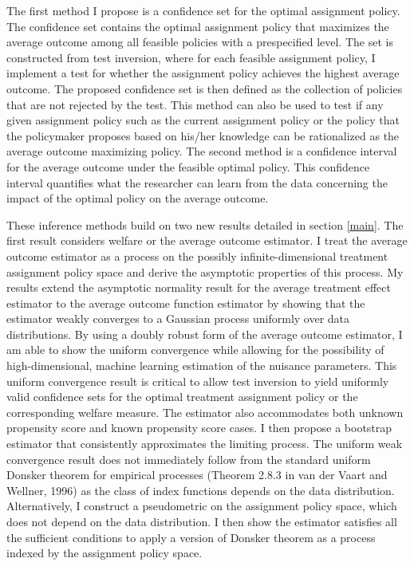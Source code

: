\documentclass[12pt,oneside,reqno,english]{amsart}
\theoremstyle{definition}
\begin{document}
The first method I propose is a confidence set for the optimal assignment policy. 
The confidence set contains the optimal assignment policy that maximizes the average outcome among all feasible policies with a prespecified level.
The set is constructed from test inversion, where for each feasible assignment policy, I implement a test for whether the assignment policy 
achieves the highest average outcome. The proposed confidence set is then defined as the collection of policies that are not rejected by the test. 
This method can also be used to test if any given assignment policy such as the current assignment policy or the policy that the policymaker proposes based on his/her knowledge can be rationalized as the average outcome maximizing policy. The second method is a confidence interval for the average outcome under the feasible optimal policy. This confidence interval quantifies what the researcher can learn from the data concerning the impact of the optimal policy on the average outcome. 


These inference methods build on two new results detailed in section \ref{main}. 
The first result considers welfare or the average outcome estimator. I treat the average outcome estimator as a process on the possibly infinite-dimensional treatment assignment policy space and derive the asymptotic
properties of this process. My results extend the asymptotic normality result for the average treatment effect estimator to the average outcome function estimator by showing that the estimator weakly converges to a Gaussian process uniformly over data distributions. 
By using a doubly robust form of the average outcome estimator, I am able to show the uniform convergence while allowing for the possibility of high-dimensional, machine learning estimation of the nuisance parameters. 
This uniform convergence result is critical to allow test inversion to yield uniformly valid confidence sets for the optimal treatment assignment policy or the corresponding welfare measure. The estimator also accommodates both unknown propensity score and known propensity score cases. I then propose a bootstrap estimator that consistently approximates the limiting process. 
The uniform weak convergence result does not immediately follow from the standard uniform Donsker theorem for empirical processes (Theorem 2.8.3 in van der Vaart and Wellner, 1996) as the class of index functions depends on the data distribution. Alternatively, I construct a pseudometric on the assignment policy space, which does not depend on the data distribution. I then show the estimator satisfies all the sufficient conditions to apply a version of Donsker theorem as a process indexed by the assignment policy space.  
\end{document}
